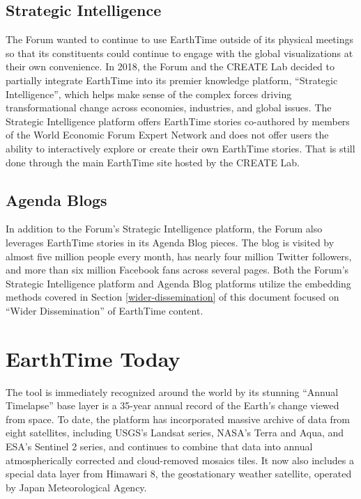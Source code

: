 \documentclass[
]{krantz}
\begin{document}
\hypertarget{strategic-intelligence}{%
\subsection*{Strategic Intelligence}\label{strategic-intelligence}}


The Forum wanted to continue to use EarthTime outside of its physical meetings so that its constituents could continue to engage with the global visualizations at their own convenience. In 2018, the Forum and the CREATE Lab decided to partially integrate EarthTime into its premier knowledge platform, ``Strategic Intelligence'', which helps make sense of the complex forces driving transformational change across economies, industries, and global issues. The Strategic Intelligence platform offers EarthTime stories co-authored by members of the World Economic Forum Expert Network and does not offer users the ability to interactively explore or create their own EarthTime stories. That is still done through the main EarthTime site hosted by the CREATE Lab.

\hypertarget{agenda-blogs}{%
\subsection*{Agenda Blogs}\label{agenda-blogs}}


In addition to the Forum's Strategic Intelligence platform, the Forum also leverages EarthTime stories in its Agenda Blog pieces. The blog is visited by almost five million people every month, has nearly four million Twitter followers, and more than six million Facebook fans across several pages. Both the Forum's Strategic Intelligence platform and Agenda Blog platforms utilize the embedding methods covered in Section \ref{wider-dissemination} of this document focused on ``Wider Dissemination'' of EarthTime content.

\hypertarget{earthtime-today}{%
\section{EarthTime Today}\label{earthtime-today}}

The tool is immediately recognized around the world by its stunning ``Annual Timelapse'' base layer is a 35-year annual record of the Earth's change viewed from space. To date, the platform has incorporated massive archive of data from eight satellites, including USGS's Landsat series, NASA's Terra and Aqua, and ESA's Sentinel 2 series, and continues to combine that data into annual atmospherically corrected and cloud-removed mosaics tiles. It now also includes a special data layer from Himawari 8, the geostationary weather satellite, operated by Japan Meteorological Agency.
\end{document}
